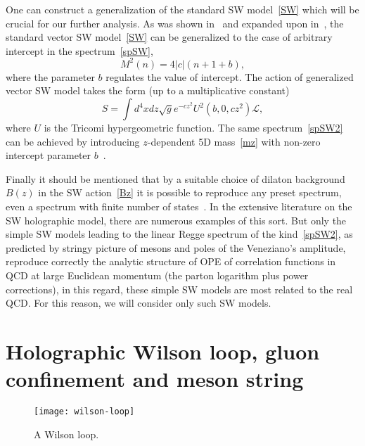 \documentclass[a4paper,11pt]{article}
\begin{document}
One can construct a generalization of the standard SW model~\eqref{SW} which will be crucial for our further analysis.
As was shown in~\cite{Afonin:2012jn} and expanded upon in~\cite{Afonin:2021cwo}, the standard vector SW model~\eqref{SW}
can be generalized to the case of arbitrary intercept in the spectrum~\eqref{spSW},
\begin{equation}
\label{spSW2}
  M^2(n)=4|c|(n+1+b),
\end{equation}
where the parameter \(b\) regulates the value of intercept. The action of generalized vector SW model
takes the form (up to a multiplicative constant)
\begin{equation}
\label{gen_sw}
  S=\int d^4xdz\sqrt{g}e^{-cz^2}U^2(b,0,cz^2)\mathcal{L},
\end{equation}
where $U$ is the Tricomi hypergeometric function. The same spectrum~\eqref{spSW2} can be achieved
by introducing $z$-dependent 5D mass~\eqref{mz} with non-zero intercept parameter $b$~\cite{Afonin:2021cwo}.

Finally it should be mentioned that by a suitable choice of dilaton background $B(z)$ in the SW action~\eqref{Bz}
it is possible to reproduce any preset spectrum, even a spectrum with finite number of states~\cite{Afonin:2009xi}.
In the extensive literature on the SW holographic model, there are
numerous examples of this sort. But only the simple SW models leading to the linear Regge spectrum of the kind~\eqref{spSW2},
as predicted by stringy picture of mesons and poles of the Veneziano's amplitude,
reproduce correctly the analytic structure of OPE of correlation functions in QCD at large Euclidean momentum
(the parton logarithm plus power corrections), in this regard, these simple SW models are most related to the real QCD.
For this reason, we will consider only such SW models.





\section{Holographic Wilson loop, gluon confinement and meson string}

\begin{wrapfigure}{R}{0.4\textwidth}
  \vspace{-10mm}
  \begin{center}
    \texttt{[image: wilson-loop]}
  \end{center}
  \vspace*{-7mm}
  \caption{\footnotesize A Wilson loop.}
  \label{wilson_loop}
\end{wrapfigure}
\end{document}
